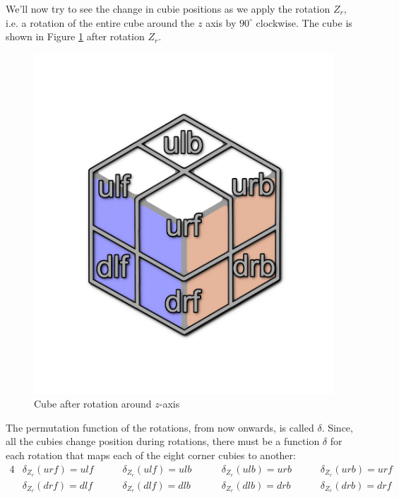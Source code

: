 \documentclass[12pt,a4paper]{article}
\theoremstyle{custom}
\begin{document}
We'll now try to see the change in cubie positions as we apply the rotation $Z_r$, i.e. a rotation of the entire cube around the $z$ axis by $90^\circ$ clockwise. The cube is shown in Figure \ref{Figure_CubeAfterRotationAroundZAxis} after rotation $Z_r$.
\begin{figure}[H]
\centering
\includegraphics[scale=0.13]{on_ulf.png}
\caption{Cube after rotation around $z$-axis}
\label{Figure_CubeAfterRotationAroundZAxis}
\end{figure}
The permutation function of the rotations, from now onwards, is called $\delta$. Since, all the cubies change position during rotations, there must be a function $\delta$ for each rotation that maps each of the eight corner cubies to another:
\begin{alignat*}{4}
& \delta_{Z_r}(\textit{urf}) = \textit{ulf} \ \ \ \ \ \ && \delta_{Z_r}(\textit{ulf}) = \textit{ulb} \ \ \ \ \ \ && \delta_{Z_r}(\textit{ulb}) = \textit{urb} \ \ \ \ \ \ && \delta_{Z_r}(\textit{urb}) = \textit{urf} \\
& \delta_{Z_r}(\textit{drf}) = \textit{dlf} \ \ \ \ \ \ && \delta_{Z_r}(\textit{dlf}) = \textit{dlb} \ \ \ \ \ \ \ && \delta_{Z_r}(\textit{dlb}) = \textit{drb} \ \ \ \ \ \ && \delta_{Z_r}(\textit{drb}) = \textit{drf}
\end{alignat*}
\end{document}

